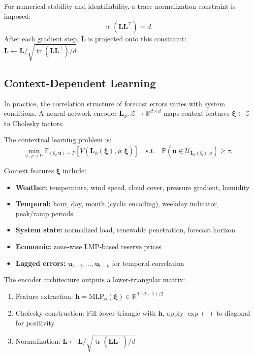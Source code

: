 \documentclass[lettersize,journal]{IEEEtran}
\newcommand{\R}{\mathbb{R}}
\newcommand{\E}{\mathbb{E}}
\newcommand{\Prob}{\mathbb{P}}
\newcommand{\cU}{\mathcal{U}}
\newcommand{\cZ}{\mathcal{Z}}
\newcommand{\bu}{\bm{u}}
\newcommand{\bxi}{\bm{\xi}}
\newcommand{\bL}{\bm{L}}
\DeclareMathOperator{\tr}{tr}
\theoremstyle{definition}
\begin{document}
For numerical stability and identifiability, a trace normalization constraint is imposed:
\begin{equation}
\tr(\bL\bL^\top) = d.
\end{equation}
After each gradient step, $\bL$ is projected onto this constraint: $\bL \leftarrow \bL / \sqrt{\tr(\bL\bL^\top)/d}$.

\subsection{Context-Dependent Learning}

In practice, the correlation structure of forecast errors varies with system conditions. A neural network encoder $\bL_\phi: \cZ \to \R^{d \times d}$ maps context features $\bxi \in \cZ$ to Cholesky factors.

The contextual learning problem is:
\begin{equation}
\min_{\phi,\, \rho > 0} \E_{(\bxi,\bu) \sim P}\left[V(\bL_\phi(\bxi), \rho; \bxi)\right] \quad \text{s.t.} \quad \Prob(\bu \in \cU_{\bL_\phi(\bxi),\rho}) \geq \tau.
\end{equation}

Context features $\bxi$ include:
\begin{itemize}
\item \textbf{Weather:} temperature, wind speed, cloud cover, pressure gradient, humidity
\item \textbf{Temporal:} hour, day, month (cyclic encoding), weekday indicator, peak/ramp periods
\item \textbf{System state:} normalized load, renewable penetration, forecast horizon
\item \textbf{Economic:} zone-wise LMP-based reserve prices
\item \textbf{Lagged errors:} $\bu_{t-1}, \ldots, \bu_{t-k}$ for temporal correlation
\end{itemize}

The encoder architecture outputs a lower-triangular matrix:
\begin{enumerate}
\item Feature extraction: $\bm{h} = \text{MLP}_\phi(\bxi) \in \R^{d(d+1)/2}$
\item Cholesky construction: Fill lower triangle with $\bm{h}$, apply $\exp(\cdot)$ to diagonal for positivity
\item Normalization: $\bL \leftarrow \bL / \sqrt{\tr(\bL\bL^\top)/d}$
\end{enumerate}
\end{document}
